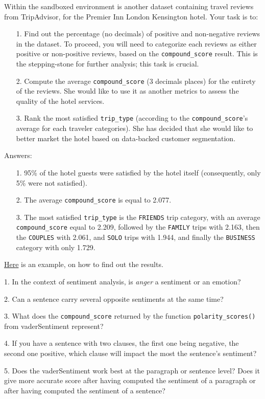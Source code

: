 	Within the sandboxed environment is another dataset containing travel reviews from TripAdvisor, for the Premier Inn London Kensington hotel. Your task is to:
	\begin{itemize}
		\item [1.] Find out the percentage (no decimals) of positive and non-negative reviews in the dataset. To proceed, you will need to categorize each reviews as either positive or non-positive reviews, based on the \verb|compound_score| result. This is the stepping-stone for further analysis; this task is crucial.
		\item [2.] Compute the average \verb|compound_score| (3 decimals places) for the entirety of the reviews. She would like to use it as another metrics to assess the quality of the hotel services. 
		\item [3.] Rank the most satisfied \verb|trip_type| (according to the \verb|compound_score|'s average for each traveler categories). She has decided that she would like to better market the hotel based on data-backed customer segmentation.
	\end{itemize}
	
	Answers:
	\begin{itemize}
		\item [1.] 95\% of the hotel guests were satisfied by the hotel itself (consequently, only 5\% were not satisfied).
		\item [2.] The average \verb|compound_score| is equal to 2.077.
		\item [3.] The most satisfied \verb|trip_type| is the \verb|FRIENDS| trip category, with an average \verb|compound_score| equal to 2.209, followed by the \verb|FAMILY| trips with 2.163, then the \verb|COUPLES| with 2.061, and \verb|SOLO| trips with 1.944, and finally the \verb|BUSINESS| category with only 1.729.
	\end{itemize}
	\href{https://gist.github.com/ryanzidago/ef8093cb553913026b0cd3348cf07c7c}{Here} is an example, on how to find out the results.
	
	\begin{testquestion}
		\item [1.] In the context of sentiment analysis, is \textit{anger} a sentiment or an emotion?
		\item [2.] Can a sentence carry several opposite sentiments at the same time?
		\item [3.] What does the \verb|compound_score| returned by the function \verb|polarity_scores()| from vaderSentiment represent?
		\item [4.] If you have a sentence with two clauses, the first one being negative, the second one positive, which clause will impact the most the sentence's sentiment?
		\item [5.] Does the vaderSentiment work best at the paragraph or sentence level? Does it give more accurate score after having computed the sentiment of a paragraph or after having computed the sentiment of a sentence?
	\end{testquestion}

